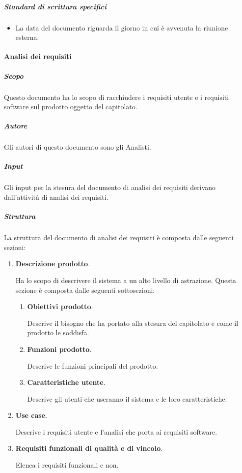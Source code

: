 \subparagraph{Standard di scrittura specifici}
\begin{itemize}
    \item La data del documento riguarda il giorno in cui è avvenuta la riunione esterna.
\end{itemize}

\paragraph{Analisi dei requisiti}

\subparagraph{Scopo}
Questo documento ha lo scopo di racchiudere i requisiti utente e i requisiti software sul prodotto oggetto del capitolato.

\subparagraph{Autore}
Gli autori di questo documento sono gli Analisti.

\subparagraph{Input}
Gli input per la stesura del documento di analisi dei requisiti derivano dall'attività di analisi dei requisiti.

\subparagraph{Struttura}
La struttura del documento di analisi dei requisiti è composta dalle seguenti sezioni:
\begin{enumerate}
    \item \textbf{Descrizione prodotto}.
    
    Ha lo scopo di descrivere il sistema a un alto livello di astrazione.
    Questa sezione è composta dalle seguenti sottosezioni:
    \begin{enumerate}
        \item \textbf{Obiettivi prodotto}.
        
        Descrive il bisogno che ha portato alla stesura del capitolato e come il prodotto le soddisfa.
        
        \item \textbf{Funzioni prodotto}.

        Descrive le funzioni principali del prodotto.

        \item \textbf{Caratteristiche utente}.
        
        Descrive gli utenti che useranno il sistema e le loro caratteristiche.
    \end{enumerate}

    \item \textbf{Use case}.
    
    Descrive i requisiti utente e l'analisi che porta ai requisiti software.
    

    \item \textbf{Requisiti funzionali di qualità e di vincolo}.
    
    Elenca i requisiti funzionali e non.
    
\end{enumerate}

